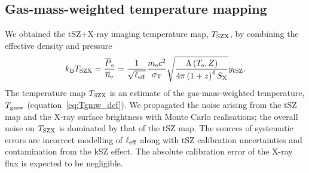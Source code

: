 \documentclass[twocolumn,traditabstract]{aa}
\def\TSZ {T_{\rm SZX}}
\def\TMW {T_{\rm gmw}}
\begin{document}
\subsection{Gas-mass-weighted temperature mapping}\label{sec:Gas_mass_weighted_temperature_mapping}
We obtained the tSZ+X-ray imaging temperature map, $\TSZ$, by combining the effective density and pressure 
\begin{equation}
        k_{\rm B} \TSZ 
        = \frac{\overline{P}_{\rm e}}{\overline{n}_{\rm e}} = \frac{1}{\sqrt{\ell_{\rm eff}}} \frac{m_{\rm e} c^2}{\sigma_{\rm T}} \sqrt{\frac{\Lambda\left(T_{\rm e}, Z\right)}{4 \pi \left(1+z\right)^4 S_{\rm X}}} y_{\rm tSZ}.
\label{eq:pseudo_tsz}
\end{equation}
The temperature map $\TSZ$ is an estimate of the gas-mass-weighted temperature, $\TMW$ (equation~\ref{eq:Tgmw_def}). We propagated the noise arising from the tSZ map and the X-ray surface brightness with Monte Carlo realisations; the overall noise on $\TSZ$ is dominated by that of the tSZ map. The sources of systematic errors are incorrect modelling of $\ell_{\rm eff}$ along with tSZ calibration uncertainties and contamination from the kSZ effect. The absolute calibration error of the X-ray flux is expected to be negligible.
\end{document}
